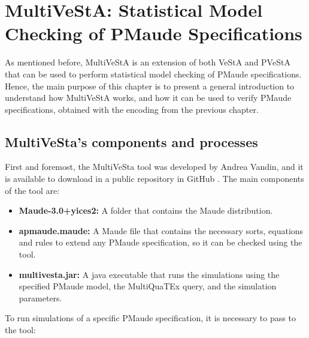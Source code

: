 \chapter{MultiVeStA: Statistical Model Checking of PMaude Specifications}

As mentioned before, MultiVeStA is an extension of both VeStA and PVeStA that can be used to perform statistical model checking of PMaude specifications. Hence, the main purpose of this chapter is to present a general introduction to understand how MultiVeStA works, and how it can be used to verify PMaude specifications, obtained with the encoding from the previous chapter.

\section{MultiVeSta's components and processes}
First and foremost, the MultiVeSta tool was developed by Andrea Vandin, and it is available to download in a public repository in GitHub \cite{multiGit}. The main components of the tool are:
\begin{itemize}
    \item \textbf{Maude-3.0+yices2:} A folder that contains the Maude distribution.
    \item \textbf{apmaude.maude:} A Maude file that contains the necessary sorts, equations and rules to extend any PMaude specification, so it can be checked using the tool. 
    \item \textbf{multivesta.jar:} A java executable that runs the simulations using the specified PMaude model, the MultiQuaTEx query, and the simulation parameters.
\end{itemize}

To run simulations of a specific PMaude specification, it is necessary to pass to the tool:

